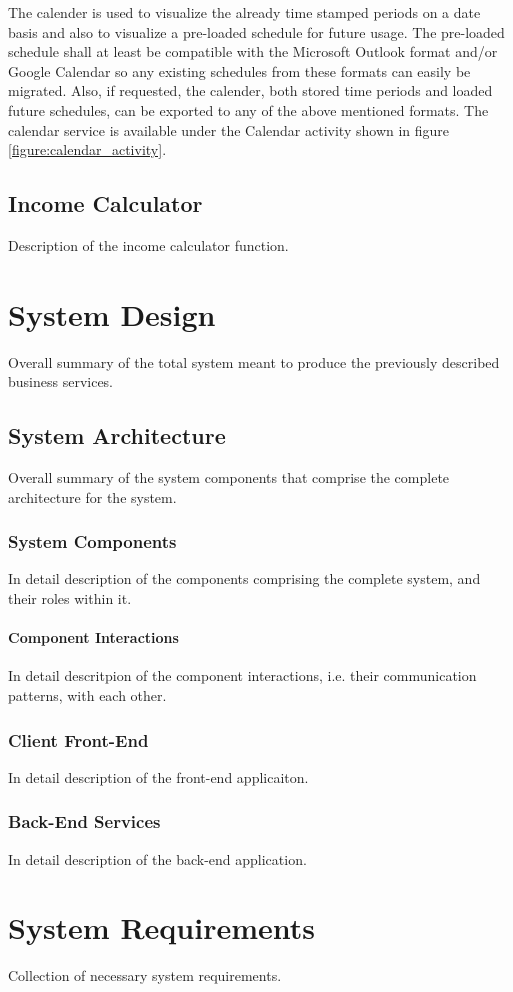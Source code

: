 \documentclass{report}
\begin{document}
The calender is used to visualize the already time stamped periods on a date basis and also to visualize a pre-loaded schedule for future usage. The pre-loaded schedule shall at least be compatible with the Microsoft Outlook format and/or Google Calendar so any existing schedules from these formats can easily be migrated. Also, if requested, the calender, both stored time periods and loaded future schedules, can be exported to any of the above mentioned formats. The calendar service is available under the Calendar activity shown in figure \ref{figure:calendar_activity}.

\section{Income Calculator}
\label{section:income_calculator}
Description of the income calculator function.

\chapter{System Design}
Overall summary of the total system meant to produce the previously described business services.

\section{System Architecture}
Overall summary of the system components that comprise the complete architecture for the system.

\subsection{System Components}
In detail description of the components comprising the complete system, and their roles within it.

\subsubsection{Component Interactions}
In detail descritpion of the component interactions, i.e. their communication patterns, with each other.

\subsection{Client Front-End}
In detail description of the front-end applicaiton.

\subsection{Back-End Services}
In detail description of the back-end application.

\chapter{System Requirements}
Collection of necessary system requirements.
\end{document}
